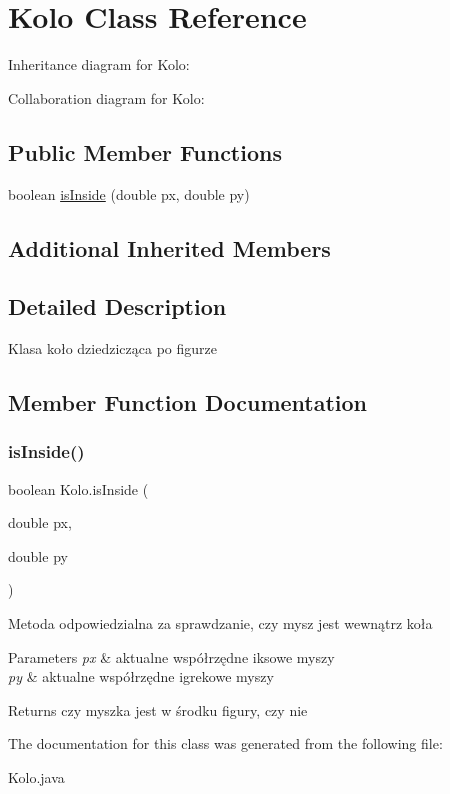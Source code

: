 \hypertarget{classKolo}{}\section{Kolo Class Reference}
\label{classKolo}


Inheritance diagram for Kolo\+:


Collaboration diagram for Kolo\+:
\subsection*{Public Member Functions}
\begin{DoxyCompactItemize}
\item 
boolean \hyperlink{classKolo_a1a60f1415904b049bcdcf8d17c1afd9a}{is\+Inside} (double px, double py)
\end{DoxyCompactItemize}
\subsection*{Additional Inherited Members}


\subsection{Detailed Description}
Klasa koło dziedzicząca po figurze 

\subsection{Member Function Documentation}
\mbox{\label{classKolo_a1a60f1415904b049bcdcf8d17c1afd9a}} 
\subsubsection{\texorpdfstring{is\+Inside()}{isInside()}}
{\footnotesize\ttfamily boolean Kolo.\+is\+Inside (\begin{DoxyParamCaption}\item[{double}]{px,  }\item[{double}]{py }\end{DoxyParamCaption})\hspace{0.3cm}{\ttfamily [inline]}}

Metoda odpowiedzialna za sprawdzanie, czy mysz jest wewnątrz koła 
\begin{DoxyParams}{Parameters}
{\em px} & aktualne współrzędne iksowe myszy \\
\hline
{\em py} & aktualne współrzędne igrekowe myszy \\
\hline
\end{DoxyParams}
\begin{DoxyReturn}{Returns}
czy myszka jest w środku figury, czy nie 
\end{DoxyReturn}


The documentation for this class was generated from the following file\+:\begin{DoxyCompactItemize}
\item 
Kolo.\+java\end{DoxyCompactItemize}
